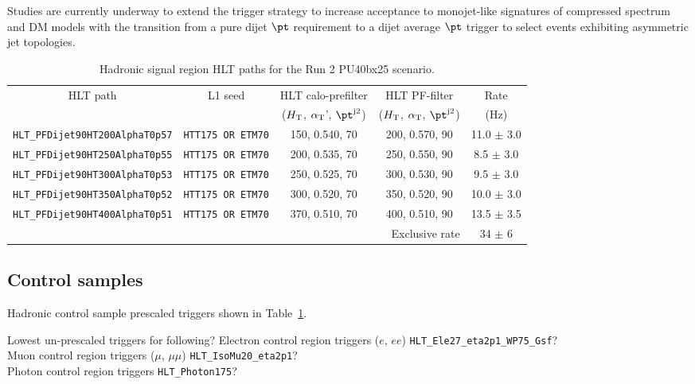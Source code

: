 Studies are currently underway to extend the trigger strategy to increase acceptance to monojet-like signatures of compressed spectrum and DM models with the transition from a pure dijet $\pt$ requirement to a dijet average $\pt$ trigger to select events exhibiting asymmetric jet topologies.




\begin{table}[h!]
\footnotesize
\centering
\begin{tabular}{|c||c|c|c||c|} 
\hline
HLT path & L1 seed & HLT calo-prefilter                      & HLT PF-filter                          & Rate \\[0.7 ex] 
         &         & ($\mbox{$H_\text{T}$}$, $\alpha_{\text{T}}$', $\pt^{\rm j2}$) & ($\mbox{$H_\text{T}$}$, $\alpha_{\text{T}}$, $\pt^{\rm j2}$) & (Hz) \\[0.7 ex] 
\hline
\verb!HLT_PFDijet90HT200AlphaT0p57! & \verb!HTT175 OR ETM70! & 150, 0.540, 70 & 200, 0.570, 90 & 11.0 $\pm$ 3.0 \\
\verb!HLT_PFDijet90HT250AlphaT0p55! & \verb!HTT175 OR ETM70! & 200, 0.535, 70 & 250, 0.550, 90 & 8.5  $\pm$ 3.0 \\
\verb!HLT_PFDijet90HT300AlphaT0p53! & \verb!HTT175 OR ETM70! & 250, 0.525, 70 & 300, 0.530, 90 & 9.5  $\pm$ 3.0 \\
\verb!HLT_PFDijet90HT350AlphaT0p52! & \verb!HTT175 OR ETM70! & 300, 0.520, 70 & 350, 0.520, 90 & 10.0 $\pm$ 3.0 \\
\verb!HLT_PFDijet90HT400AlphaT0p51! & \verb!HTT175 OR ETM70! & 370, 0.510, 70 & 400, 0.510, 90 & 13.5 $\pm$ 3.5 \\
\hline
\multicolumn{4}{|r||}{Exclusive rate} & 34 $\pm$ 6 \\
\hline


\end{tabular}
\caption{Hadronic signal region HLT paths for the Run 2 PU40bx25 scenario. }
\label{tab:2015_Hadronic_Signal_Triggers}
\end{table}




\subsection{Control samples}
Hadronic control sample prescaled triggers shown in Table~\ref{tab:2015_Hadronic_Signal_Triggers}.

Lowest un-prescaled triggers for following?
Electron control region triggers ($e$, $ee$) \verb!HLT_Ele27_eta2p1_WP75_Gsf!? \\
Muon control region triggers ($\mu$, $\mu\mu$) \verb!HLT_IsoMu20_eta2p1!?\\
Photon control region triggers \verb!HLT_Photon175!?\\


